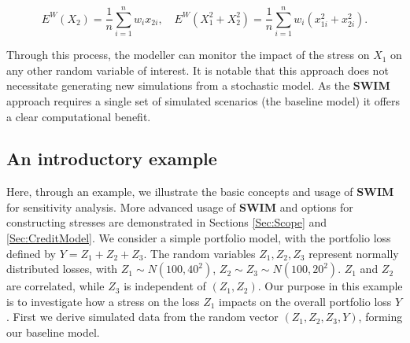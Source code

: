\documentclass[
]{article}
\begin{document}
\[
E^W(X_2)=\frac 1  n\sum_{i=1}^n w_i x_{2i},\quad E^W(X_1^2+X_2^2)=\frac 1  n \sum_{i=1}^n w_i \left(x_{1i}^2+ x_{2i}^2 \right).
\]

Through this process, the modeller can monitor the impact of the stress on \(X_1\) on any other random variable of interest. It is notable that this approach does not necessitate generating new simulations from a stochastic model. As the \textbf{SWIM} approach requires a single set of simulated scenarios (the baseline model) it offers a clear computational benefit.

\hypertarget{an-introductory-example}{%
\subsection{An introductory example}\label{an-introductory-example}}

Here, through an example, we illustrate the basic concepts and usage of \textbf{SWIM} for sensitivity analysis. More advanced usage of \textbf{SWIM} and options for constructing stresses are demonstrated in Sections \ref{Sec:Scope} and \ref{Sec:CreditModel}.
We consider a simple portfolio model, with the portfolio loss defined by \(Y=Z_1+Z_2+Z_3\). The random variables \(Z_1,Z_2,Z_3\) represent normally distributed losses, with \(Z_1\sim N(100,40^2)\), \(Z_2\sim Z_3\sim N(100,20^2)\). \(Z_1\) and \(Z_2\) are correlated, while \(Z_3\) is independent of \((Z_1,Z_2)\). Our purpose in this example is to investigate how a stress on the loss \(Z_1\) impacts on the overall portfolio loss \(Y\).
First we derive simulated data from the random vector \((Z_1,Z_2,Z_3,Y)\), forming our baseline model.
\end{document}
